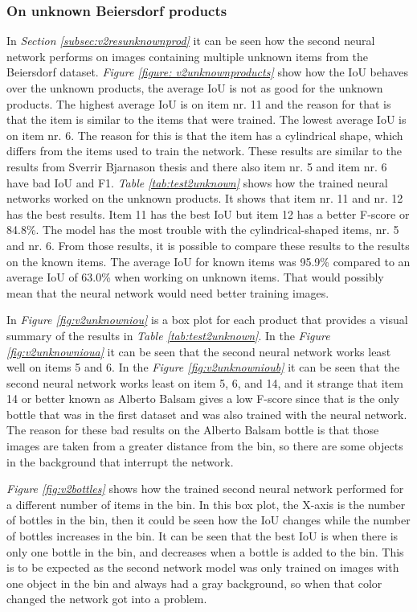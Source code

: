 \subsubsection{On unknown Beiersdorf products}
In \textit{Section \ref{subsec:v2resunknownprod}} it can be seen how the second neural network performs on images containing multiple unknown items from the Beiersdorf dataset. \textit{Figure \ref{figure: v2unknownproducts}} show how the IoU behaves over the unknown products, the average IoU is not as good for the unknown products. The highest average IoU is on item nr. 11 and the reason for that is that the item is similar to the items that were trained. The lowest average IoU is on item nr. 6. The reason for this is that the item has a cylindrical shape, which differs from the items used to train the network. These results are similar to the results from Sverrir Bjarnason thesis\cite{bjarnason_detecting_2021} and there also item nr. 5 and item nr. 6 have bad IoU and F1.
\textit{Table \ref{tab:test2unknown}} shows how the trained neural networks worked on the unknown products. It shows that item nr. 11 and nr. 12 has the best results. Item 11 has the best IoU but item 12 has a better F-score or 84.8\%. The model has the most trouble with the cylindrical-shaped items, nr. 5 and nr. 6. From those results, it is possible to compare these results to the results on the known items. The average IoU for known items was 95.9\% compared to an average IoU of 63.0\% when working on unknown items. That would possibly mean that the neural network would need better training images. 

In \textit{Figure \ref{fig:v2unknowniou}} is a box plot for each product that provides a visual summary of the results in \textit{Table \ref{tab:test2unknown}}. In the \textit{Figure \ref{fig:v2unknownioua}} it can be seen that the second neural network works least well on items 5 and 6. In the \textit{Figure \ref{fig:v2unknownioub}} it can be seen that the second neural network works least on item 5, 6, and 14, and it strange that item 14 or better known as Alberto Balsam gives a low F-score since that is the only bottle that was in the first dataset and was also trained with the neural network. The reason for these bad results on the Alberto Balsam bottle is that those images are taken from a greater distance from the bin, so there are some objects in the background that interrupt the network. 

\textit{Figure \ref{fig:v2bottles}} shows how the trained second neural network performed for a different number of items in the bin. In this box plot, the X-axis is the number of bottles in the bin, then it could be seen how the IoU changes while the number of bottles increases in the bin. It can be seen that the best IoU is when there is only one bottle in the bin, and decreases when a bottle is added to the bin. This is to be expected as the second network model was only trained on images with one object in the bin and always had a gray background, so when that color changed the network got into a problem.

